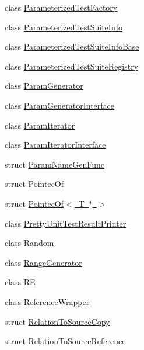 \begin{DoxyCompactItemize}
\item 
class \mbox{\hyperlink{classtesting_1_1internal_1_1_parameterized_test_factory}{Parameterized\+Test\+Factory}}
\item 
class \mbox{\hyperlink{classtesting_1_1internal_1_1_parameterized_test_suite_info}{Parameterized\+Test\+Suite\+Info}}
\item 
class \mbox{\hyperlink{classtesting_1_1internal_1_1_parameterized_test_suite_info_base}{Parameterized\+Test\+Suite\+Info\+Base}}
\item 
class \mbox{\hyperlink{classtesting_1_1internal_1_1_parameterized_test_suite_registry}{Parameterized\+Test\+Suite\+Registry}}
\item 
class \mbox{\hyperlink{classtesting_1_1internal_1_1_param_generator}{Param\+Generator}}
\item 
class \mbox{\hyperlink{classtesting_1_1internal_1_1_param_generator_interface}{Param\+Generator\+Interface}}
\item 
class \mbox{\hyperlink{classtesting_1_1internal_1_1_param_iterator}{Param\+Iterator}}
\item 
class \mbox{\hyperlink{classtesting_1_1internal_1_1_param_iterator_interface}{Param\+Iterator\+Interface}}
\item 
struct \mbox{\hyperlink{structtesting_1_1internal_1_1_param_name_gen_func}{Param\+Name\+Gen\+Func}}
\item 
struct \mbox{\hyperlink{structtesting_1_1internal_1_1_pointee_of}{Pointee\+Of}}
\item 
struct \mbox{\hyperlink{structtesting_1_1internal_1_1_pointee_of_3_01_t_01_5_01_4}{Pointee\+Of$<$ T $\ast$ $>$}}
\item 
class \mbox{\hyperlink{classtesting_1_1internal_1_1_pretty_unit_test_result_printer}{Pretty\+Unit\+Test\+Result\+Printer}}
\item 
class \mbox{\hyperlink{classtesting_1_1internal_1_1_random}{Random}}
\item 
class \mbox{\hyperlink{classtesting_1_1internal_1_1_range_generator}{Range\+Generator}}
\item 
class \mbox{\hyperlink{classtesting_1_1internal_1_1_r_e}{RE}}
\item 
class \mbox{\hyperlink{classtesting_1_1internal_1_1_reference_wrapper}{Reference\+Wrapper}}
\item 
struct \mbox{\hyperlink{structtesting_1_1internal_1_1_relation_to_source_copy}{Relation\+To\+Source\+Copy}}
\item 
struct \mbox{\hyperlink{structtesting_1_1internal_1_1_relation_to_source_reference}{Relation\+To\+Source\+Reference}}

\end{DoxyCompactItemize}
